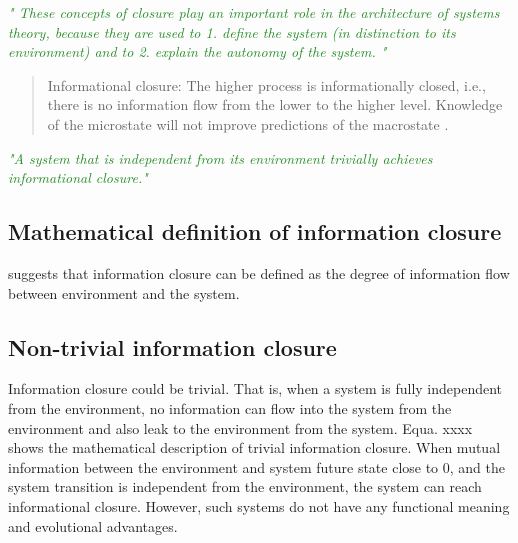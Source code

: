 \documentclass[utf8]{article}
\newcommand{\rewrite}[1]{\textcolor{ForestGreen}{\textit{"#1"}}\newline}
\begin{document}
		
		\rewrite{
			These concepts of closure play an important role in the architecture of systems
			theory, because they are used to
			1. define the system (in distinction to its environment) and to 
			2. explain the autonomy of the system.
		}
		
		
		\begin{quotation}
			Informational closure: The higher process is informationally closed, i.e., there is no information flow from the lower to the higher level. Knowledge of the microstate will not improve predictions of the macrostate \citep[p. 4]{PFANTE.2014}.
		\end{quotation}
		
		
		\rewrite{A system that is independent from its environment trivially achieves informational 
			closure.}
		\citep{BERTSCHINGER.2006}
		
		
		
		\subsection{Mathematical definition of information closure}

		
		suggests that information closure can be defined as the degree of information flow between environment and the system. 
		
		

		
		
		
		
		
		\subsection{Non-trivial information closure}
		Information closure could be trivial. That is, when a system is fully independent from the environment, no information can flow into the system from the environment and also leak to the environment from the system. Equa. xxxx shows the mathematical description of trivial information closure. When mutual information between the environment and system future state close to 0, and the system transition is independent from the environment, the system can reach informational closure. However, such systems do not have any functional meaning and evolutional advantages.
		
\end{document}
